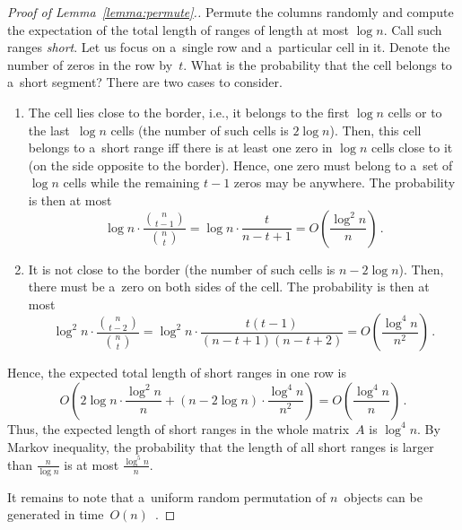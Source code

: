 \documentclass[11pt,letterpaper]{article}
\begin{document}
\begin{proof}[Proof of Lemma~\ref{lemma:permute}.]
Permute the columns randomly and compute the expectation of
the total length of ranges of length at most $\log n$. Call such ranges \emph{short}. Let us focus on a~single row and a~particular cell in it. Denote the number of zeros in the row by~$t$. What is the probability that the cell belongs to a~short segment? There are two cases to consider.
\begin{enumerate}
\item The cell lies close to the border, i.e., it belongs to
the first $\log n$ cells or to the last~$\log n$ cells
(the number of such cells is $2\log n$). Then,
this cell belongs to a~short range iff there is at least one zero
in $\log n$ cells close to it (on the side opposite to the border).
Hence, one zero must belong to a~set of $\log n$ cells while the remaining $t-1$ zeros may be anywhere.
The probability is then at most
\[\log n \cdot \frac{\binom{n}{t-1}}{\binom{n}{t}}=\log n \cdot \frac{t}{n-t+1}=O\left(\frac{\log^2n}{n}\right) \, .\]
\item It is not close to the border (the number of such cells is $n-2\log n$). Then, there must be a~zero on both sides of the
cell. The probability is then at most
\[\log^2 n \cdot \frac{\binom{n}{t-2}}{\binom{n}{t}}=\log^2n \cdot \frac{t(t-1)}{(n-t+1)(n-t+2)}=O\left(\frac{\log^4 n}{n^2}\right) \, .\]
\end{enumerate}
Hence, the expected total length of short ranges in one row is
\[O\left( 2\log n \cdot \frac{\log^2 n}{n} + (n-2\log n) \cdot \frac{\log^4 n}{n^2}\right)=O\left(\frac{\log^4 n}{n}\right) \, .\]
Thus, the expected length of short ranges in the whole 
matrix~$A$ is $\log^4n$. By Markov inequality, the probability that
the length of all short ranges is larger than $\frac{n}{\log n}$ is 
at most $\frac{\log^5 n}{n}$.

It remains to note that a~uniform random permutation 
of $n$~objects can be generated in time~$O(n)$~\cite[Algorithm~P (Shuffling)]{DBLP:books/lib/Knuth98}.
\end{proof}
\end{document}
